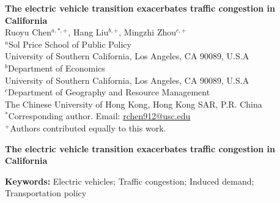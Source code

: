 \documentclass[11pt, letterpaper]{article}
\begin{document}
\noindent
\large \textbf{The electric vehicle transition exacerbates traffic congestion in California}\\[2.5ex]
\normalsize Ruoyu Chen$^{a,*,+}$, Hang Liu$^{b,+}$, Mingzhi Zhou$^{c,+}$\\[2.5ex]
$^{a}$Sol Price School of Public Policy\\
University of Southern California, Los Angeles, CA 90089, U.S.A\\[2.5ex]
$^{b}$Department of Economics\\
University of Southern California, Los Angeles, CA 90089, U.S.A\\[2.5ex]
$^{c}$Department of Geography and Resource Management\\
The Chinese University of Hong Kong, Hong Kong SAR, P.R. China\\[2.5ex]
$^{*}$Corresponding author. Email: \href{mailto:rchen912@usc.edu}{rchen912@usc.edu}\\
$^{+}$Authors contributed equally to this work.
\normalsize

\newpage
\begin{center}
{\large \textbf{The electric vehicle transition exacerbates traffic congestion in California}}\\[2.5ex]
\begin{abstract}
\noindent
Fleet electrification is a cornerstone of transportation decarbonization, but the behavioral shifts it brings, and the costs for the transportation system, remain largely unexamined.
Using a ZIP code-level panel of vehicle registrations and freeway sensor data across California (2014--2023), we show that battery electric vehicle (BEV) adoption generates a traffic congestion externality: a doubling of BEV counts reduces peak-hour freeway speeds by 0.69\%, robust across specifications and samples and costing about \$362 million annually in lost travel time.
Three associated behavioral shifts help explain it: fleet expansion, induced travel demand, and falling transit ridership, which deepen car dependency and undermine the emissions benefit of BEVs.
The costs fall unevenly: increased congestion concentrates in high-income and densely populated communities, while the decline of public transit is most severe in lower-income and car-dependent areas.
We conclude that decarbonizing the vehicle fleet can degrade the mobility system unless paired with demand-management, land-use, and public transit policy.
\end{abstract}
\noindent\textbf{Keywords:} Electric vehicles; Traffic congestion; Induced demand; Transportation policy
\end{center}
\end{document}
